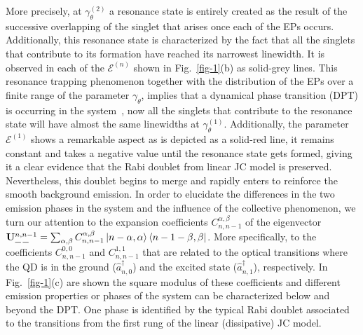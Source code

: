 \documentclass[aps,prl,showpacs,twocolumn]{revtex4}
\newcommand{\ket}[1]{\left| #1 \right>} %
\newcommand{\bra}[1]{\left< #1 \right|} %
\newcommand{\m}{\mathbin{\tikz[x=1.4ex,y=1.4ex,line width=.1ex] \draw (0.0,0) -- (1.0,0) ;}}
\begin{document}
More precisely, at $\gamma_{\theta}^{(2)}$ a resonance state is entirely created as the result of the successive overlapping of the singlet that arises once each of the EPs occurs. Additionally, this resonance state is characterized by the fact that all the singlets that contribute to its formation have reached its narrowest linewidth. It is observed in each of the $\mathcal{E}^{(n)}$ shown in Fig.~\ref{fig-1}(b) as solid-grey lines.
This resonance trapping phenomenon \cite{Jung:1999} together with the distribution of the EPs over a finite range of the parameter $\gamma_{\theta}$, implies that a dynamical phase transition (DPT) is occurring in the system~\cite{Rotter:2010}, now all the singlets that contribute to the resonance state will have almost the same linewidths at  $\gamma_{\theta}^{(1)}$.
Additionally, the parameter $\mathcal{E}^{(1)}$ shows a remarkable aspect as is depicted as a solid-red line, it remains constant and takes a negative value until the resonance state gets formed, giving it a clear evidence that the Rabi doublet from linear JC model is preserved. Nevertheless, this doublet begins to merge and rapidly enters to reinforce the smooth background emission. In order to elucidate the differences in the two emission phases in the system and the influence of the collective phenomenon, we turn our attention to the expansion coefficients $C^{\alpha,\beta}_{n,n-1}$ of the eigenvector 
${\mathbf U}^{n,n-1}_{\m\,\m}=\sum_{\alpha,\beta}C^{\alpha,\beta}_{n,n-1}\ket{n-\alpha,\alpha}\bra{n-1-\beta,\beta}$. More specifically, to the coefficients $C^{0,0}_{n,n-1}$ and $C^{1,1}_{n,n-1}$ that are related to the optical transitions where the QD is in the ground ($\hat{a}^{\dagger}_{n,0}$) and the excited state ($\hat{a}^{\dagger}_{n,1}$), respectively. In Fig.~\ref{fig-1}(c) are shown the square modulus of these coefficients and different emission properties or phases of the system can be characterized below and beyond the DPT. One phase is identified by the typical Rabi doublet associated to the transitions from the first rung of the linear (dissipative) JC model.
\end{document}
